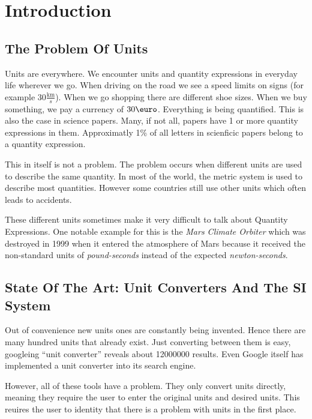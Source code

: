 \section{Introduction}

\subsection{The Problem Of Units}

Units are everywhere. We encounter units and quantity expressions in everyday life wherever we go. When driving on the road we see a speed limits on signs (for example $30 \frac{\text{km}}{s}$). When we go shopping there are different shoe sizes. When we buy something, we pay a currency of $30 \text{\euro}$. Everything is being quantified. This is also the case in science papers. Many, if not all, papers have 1 or more quantity expressions in them. Approximatly 1\% of all letters in scienficic papers belong to a quantity expression.

This in itself is not a problem. The problem occurs when different units are used to describe the same quantity. In most of the world, the metric system is used to describe most quantities. However some countries still use other units which often leads to accidents.

These different units sometimes make it very difficult to talk about Quantity Expressions. One notable example for this is the \textit{Mars Climate Orbiter} which was destroyed in 1999 when it entered the atmosphere of Mars because it received the non-standard units of \textit{pound-seconds} instead of the expected \textit{newton-seconds}\cite{nasa:mcor}.

\subsection{State Of The Art: Unit Converters And The SI System}

Out of convenience new units ones are constantly being invented. Hence there are many hundred units that already exist. Just converting between them is easy, googleing ``unit converter'' reveals about 12000000 results. Even Google itself has implemented a unit converter into its search engine.

However, all of these tools have a problem. They only convert units directly, meaning they require the user to enter the original units and desired units. This reuires the user to identity that there is a problem with units in the first place.

